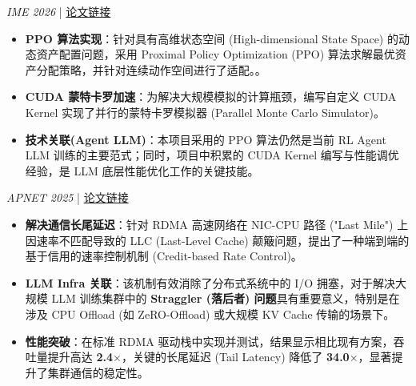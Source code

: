 \documentclass{resume}
\begin{document}
\vspace{0.1cm}

\textit{IME 2026} \quad | \quad \href{https://www.sciencedirect.com/science/article/pii/S0167668725001246}{论文链接}
\begin{itemize}[parsep=0.3ex]
  \item \textbf{PPO 算法实现}：针对具有高维状态空间 (High-dimensional State Space) 的动态资产配置问题，采用 Proximal Policy Optimization (PPO) 算法求解最优资产分配策略，并针对连续动作空间进行了适配。。
  \item \textbf{CUDA 蒙特卡罗加速}：为解决大规模模拟的计算瓶颈，编写自定义 CUDA Kernel 实现了并行的蒙特卡罗模拟器 (Parallel Monte Carlo Simulator)。
  \item \textbf{技术关联(Agent LLM)}：本项目采用的 PPO 算法仍然是当前 RL Agent LLM 训练的主要范式；同时，项目中积累的 CUDA Kernel 编写与性能调优经验，是 LLM 底层性能优化工作的关键技能。
\end{itemize}

\vspace{0.1cm}

\textit{APNET 2025} \quad | \quad \href{https://dl.acm.org/doi/10.1145/3735358.3735376}{论文链接}
\begin{itemize}[parsep=0.3ex]
  \item \textbf{解决通信长尾延迟}：针对 RDMA 高速网络在 NIC-CPU 路径 ("Last Mile") 上因速率不匹配导致的 LLC (Last-Level Cache) 颠簸问题，提出了一种端到端的基于信用的速率控制机制 (Credit-based Rate Control)。
  \item \textbf{LLM Infra 关联}：该机制有效消除了分布式系统中的 I/O 拥塞，对于解决大规模 LLM 训练集群中的 \textbf{Straggler (落后者) 问题}具有重要意义，特别是在涉及 CPU Offload (如 ZeRO-Offload) 或大规模 KV Cache 传输的场景下。
  \item \textbf{性能突破}：在标准 RDMA 驱动栈中实现并测试，结果显示相比现有方案，吞吐量提升高达 \textbf{2.4$\times$}，关键的长尾延迟 (Tail Latency) 降低了 \textbf{34.0$\times$}，显著提升了集群通信的稳定性。
\end{itemize}

\vspace{0.1cm}
\end{document}
